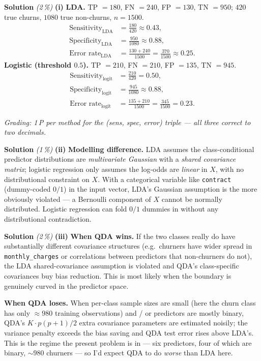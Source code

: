 \documentclass[11pt,a4paper]{article}
\newcommand{\subpoints}[1]{\textit{(#1\,\%)}}
\newcommand{\sol}{\noindent\textbf{Solution}}
\begin{document}
\sol{} \subpoints{2} \textbf{(i)} \textbf{LDA.} TP $= 180$, FN $= 240$, FP $= 130$, TN $= 950$;
$420$ true churns, $1080$ true non-churns, $n = 1500$.
\begin{align*}
\text{Sensitivity}_{\mathrm{LDA}} &= \frac{180}{420} \approx \boxed{0.43}, \\
\text{Specificity}_{\mathrm{LDA}} &= \frac{950}{1080} \approx \boxed{0.88}, \\
\text{Error rate}_{\mathrm{LDA}} &= \frac{130 + 240}{1500} = \frac{370}{1500} \approx \boxed{0.25}.
\end{align*}
\textbf{Logistic (threshold $0.5$).} TP $= 210$, FN $= 210$, FP $= 135$, TN $= 945$.
\begin{align*}
\text{Sensitivity}_{\mathrm{logit}} &= \frac{210}{420} = \boxed{0.50}, \\
\text{Specificity}_{\mathrm{logit}} &= \frac{945}{1080} \approx \boxed{0.88}, \\
\text{Error rate}_{\mathrm{logit}} &= \frac{135 + 210}{1500} = \frac{345}{1500} = \boxed{0.23}.
\end{align*}

\noindent\emph{Grading: 1\,P per method for the (sens, spec, error) triple --- all three correct
to two decimals.}

\medskip
\sol{} \subpoints{1} \textbf{(ii)} \textbf{Modelling difference.} LDA assumes the class-conditional
predictor distributions are \emph{multivariate Gaussian} with a \emph{shared covariance matrix};
logistic regression only assumes the log-odds are \emph{linear} in $X$, with no distributional
constraint on $X$. With a categorical variable like \texttt{contract} (dummy-coded $0/1$) in the
input vector, LDA's Gaussian assumption is the more obviously violated --- a Bernoulli component
of $X$ cannot be normally distributed. Logistic regression can fold $0/1$ dummies in without any
distributional contradiction.

\medskip
\sol{} \subpoints{2} \textbf{(iii)} \textbf{When QDA wins.} If the two classes really do have
substantially different covariance structures (e.g.\ churners have wider spread in
\texttt{monthly\_charges} or correlations between predictors that non-churners do not), the LDA
shared-covariance assumption is violated and QDA's class-specific covariances buy bias reduction.
This is most likely when the boundary is genuinely curved in the predictor space.

\textbf{When QDA loses.} When per-class sample sizes are small (here the churn class has only
$\approx 980$ training observations) and / or predictors are mostly binary, QDA's $K\cdot p(p+1)/2$
extra covariance parameters are estimated noisily; the variance penalty exceeds the bias saving
and QDA test error rises above LDA's. This is the regime the present problem is in --- six
predictors, four of which are binary, $\sim 980$ churners --- so I'd expect QDA to do \emph{worse}
than LDA here.
\end{document}
